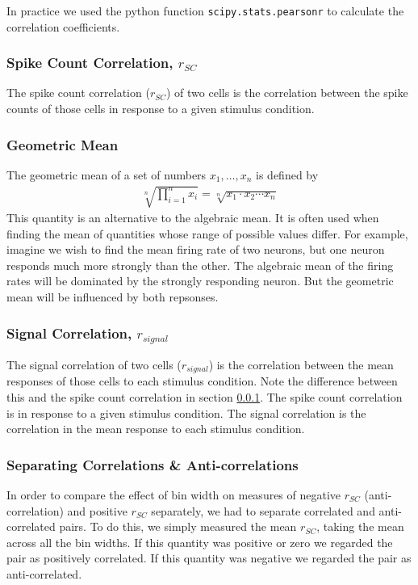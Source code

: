 \documentclass[a4paper,12pt]{article}
\theoremstyle{definition}
\begin{document}
In practice we used the python function \texttt{scipy.stats.pearsonr} to calculate the correlation coefficients.

\subsubsection{Spike Count Correlation, $r_{SC}$}\label{sec:spike_count_correlation}
The spike count correlation ($r_{SC}$) of two cells is the correlation between the spike counts of those cells in response to a given stimulus condition.

\subsubsection{Geometric Mean}\label{sec:geometric_mean}
The geometric mean of a set of numbers $x_1, \dots , x_n$ is defined by
\begin{align}
  \sqrt[n]{\prod_{i=1}^n x_i} = \sqrt[n]{x_1 \cdot x_2 \cdots x_n}
\end{align}
This quantity is an alternative to the algebraic mean. It is often used when finding the mean of quantities whose range of possible values differ. For example, imagine we wish to find the mean firing rate of two neurons, but one neuron responds much more strongly than the other. The algebraic mean of the firing rates will be dominated by the strongly responding neuron. But the geometric mean will be influenced by both repsonses.

\subsubsection{Signal Correlation, $r_{signal}$}
The signal correlation of two cells ($r_{signal}$) is the correlation between the mean responses of those cells to each stimulus condition. Note the difference between this and the spike count correlation in section \ref{sec:spike_count_correlation}. The spike count correlation is in response to a given stimulus condition. The signal correlation is the correlation in the mean response to each stimulus condition.

\subsubsection{Separating Correlations \& Anti-correlations}\label{sec:corr_anti_corr}
In order to compare the effect of bin width on measures of negative $r_{SC}$ (anti-correlation) and positive $r_{SC}$ separately, we had to separate correlated and anti-correlated pairs. To do this, we simply measured the mean $r_{SC}$, taking the mean across all the bin widths. If this quantity was positive or zero we regarded the pair as positively correlated. If this quantity was negative we regarded the pair as anti-correlated.
\end{document}
